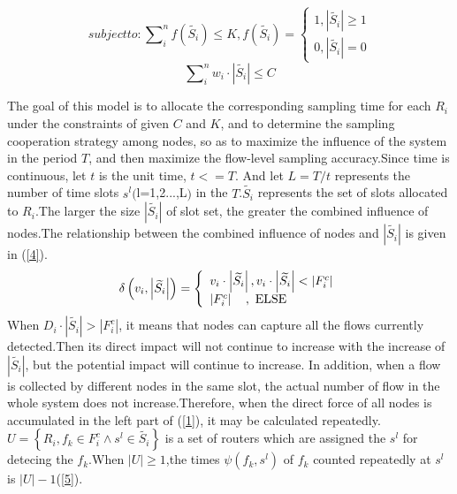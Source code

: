 \documentclass[conference]{IEEEtran}
\begin{document}
\begin{equation}
subject to: \sum\nolimits_i^n {f(\widetilde {{S_i}}) \le } K,f(\widetilde {{S_i}}) = \left\{ \begin{array}{l}
1,\left| {\widetilde {{S_i}}} \right| \ge 1\\
0,\left| {\widetilde {{S_i}}} \right| = 0
\end{array} \right.\label{2}
\end{equation}
\begin{equation}
\sum\nolimits_{i}^{n}{{{w}_{i}}\cdot \left| \widetilde{{{S}_{i}}} \right|\le C}\label{3}
\end{equation}

The goal of this model is to allocate the corresponding sampling time for each $R_i$ under the constraints of given $C$ and $K$, and to determine the sampling cooperation strategy among nodes, so as to maximize the influence of the system in the period $T$, and then maximize the flow-level sampling accuracy.Since time is continuous, let $t$ is the unit time, $t<=T$. And let $L = T/t$ represents the number of time slots ${{s}^{l}}($l=1,2...,L$)$ in the $T$.$\widetilde{{{S}_{i}}}$ represents the set of slots allocated to $R_i$.The larger the size $|\widetilde{{{S}_{i}}}|$ of slot set, the greater the combined influence of nodes.The relationship between the combined influence of nodes and $|\widetilde{{{S}_{i}}}|$ is given in (\ref{4}).
\begin{equation}
\delta \left( {{v_i},\left| {\widetilde {{S_i}}} \right|} \right) = \left\{ \begin{array}{l}
{v_i} \cdot \left| {\widetilde {{S_i}}} \right|,{\rm{    }}{v_i} \cdot \left| {\widetilde {{S_i}}} \right| < \left| {F_i^c} \right|\\
\left| {F_i^c} \right|{\rm{   }}\quad,\ {\rm{    ELSE}}
\end{array} \right.\label{4}
\end{equation}
When $ D_i\cdot |\widetilde{{{S}_{i}}}|>|F^c_i|$, it means that nodes can capture all the flows currently detected.Then its direct impact will not continue to increase with the increase of $|\widetilde{{{S}_{i}}}|$, but the potential impact will continue to increase. In addition, when a flow is collected by different nodes in the same slot, the actual number of flow in the whole system does not increase.Therefore, when the direct force of all nodes is accumulated in the left part of (\ref{1}), it may be calculated repeatedly.$U = \left\{ {{R_i},{f_k} \in F_i^c \wedge {s^l} \in \widetilde {{S_i}}} \right\}$ is a set of routers which are assigned the ${{s}^{l}}$ for detecing the $f_k$.When $|U|\ge 1$,the times $\psi ({{f}_{k}},{{s}^{l}})$ of $f_k$ counted repeatedly at ${{s}^{l}}$ is $|U|-1$(\ref{5}).
\end{document}
